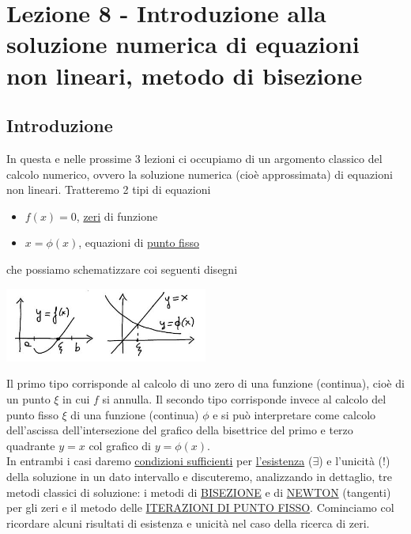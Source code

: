 \documentclass[12pt]{article}
\begin{document}
\section[Lezione 8 - Metodo di bisezione]{Lezione 8 - Introduzione alla soluzione numerica di equazioni non lineari, metodo di bisezione}
\subsection{Introduzione}
In questa e nelle prossime 3 lezioni ci occupiamo di un argomento classico del calcolo numerico, ovvero la soluzione numerica (cioè approssimata) di equazioni non lineari. Tratteremo 2 tipi di equazioni
\begin{itemize}
    \item $f(x)=0$, \uline{zeri} di funzione
    \item $x=\phi(x)$, equazioni di \uline{punto fisso}
\end{itemize}
che possiamo schematizzare coi seguenti disegni
\begin{center}
        \includegraphics[width=0.5\textwidth]{1.JPG}\par
\end{center}
Il primo tipo corrisponde al calcolo di uno zero di una funzione (continua), cioè di un punto $\xi$ in cui $f$ si annulla. Il secondo tipo corrisponde invece al calcolo del punto fisso $\xi$ di una funzione (continua) $\phi$ e si può interpretare come calcolo dell'ascissa dell'intersezione del grafico della bisettrice del primo e terzo quadrante $y=x$ col grafico di $y=\phi(x)$.\\ In entrambi i casi daremo \uline{condizioni sufficienti} per \uline{l'esistenza} ($\exists$) e l'unicità (!) della soluzione in un dato intervallo e discuteremo, analizzando in dettaglio, tre metodi classici di soluzione: i metodi di \uline{BISEZIONE} e di \uline{NEWTON} (tangenti) per gli zeri e il metodo delle \uline{ITERAZIONI DI PUNTO FISSO}.
\newline
Cominciamo col ricordare alcuni risultati di esistenza e unicità nel caso della ricerca di zeri.
\end{document}
